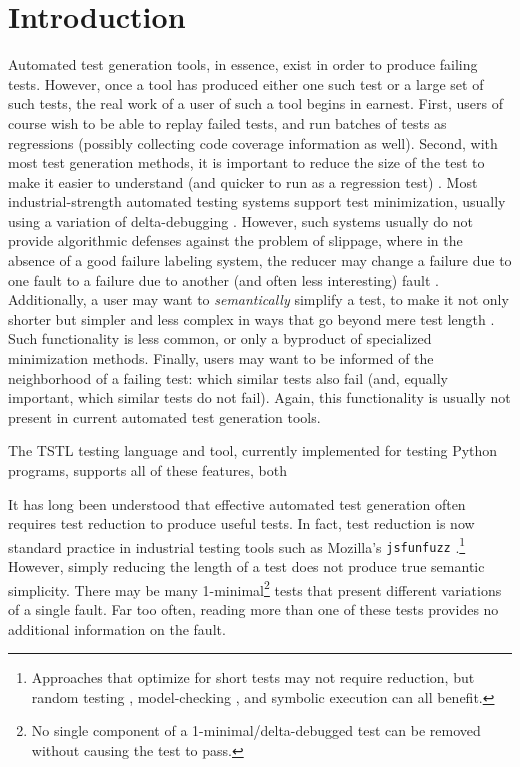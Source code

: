 \section{Introduction}

Automated test generation tools, in essence, exist in order to produce
failing tests.  However, once a tool has produced either one such test
or a large set of such tests, the real work of a user of such a tool
begins in earnest.  First, users of course wish to be able to replay
failed tests, and run batches of tests as regressions (possibly
collecting code coverage information as well).  Second, with most test generation methods, it is
important to reduce the size of the test to make it easier to
understand (and quicker to run as a regression test)
\cite{DD,MinUnit,TCminim,ICSEDiff}.  Most industrial-strength
automated testing systems support test minimization, usually using a
variation of delta-debugging \cite{CReduce,hypothesis,lithum}.
However, such systems usually do not provide algorithmic defenses
against the problem of slippage, where in the absence of a good
failure labeling system, the reducer may change a failure due to one
fault to a failure due to another (and often less interesting) fault \cite{PLDI13,slippage}.
Additionally, a user may want to \emph{semantically} simplify a test, to
make it not only shorter but simpler and less complex in ways that go
beyond mere test length \cite{OneTest}.  Such functionality is less common, or only a
byproduct of specialized minimization methods.  Finally, users may
want to be informed of the neighborhood of a failing test:  which
similar tests also fail (and, equally important, which similar tests
do not fail).  Again, this functionality is usually not present in
current automated test generation tools.

The TSTL testing language and tool, currently implemented for testing
Python programs, supports all of these features, both 

It has long been understood that effective automated test generation often requires
test reduction \cite{DD,MinUnit,TCminim,ICSEDiff} to produce useful tests.  In fact, test reduction is
now standard practice in industrial testing tools such as Mozilla's
{\tt jsfunfuzz} \cite{jsfunfuzz,jsfunfuzz2,lithium}.\footnote{Approaches that
  optimize for short tests \cite{SoftBET,FA11} may not require reduction, but random
  testing \cite{RandFormal,HamletOnly}, model-checking
  \cite{Gastin04minimizationof}, and symbolic execution \cite{issta14}
  can all benefit.}  However, simply reducing the length of a test
does not produce true semantic simplicity.  There may be many
1-minimal\footnote{No
  single component of a 1-minimal/delta-debugged \cite{DD} test can be removed without
  causing the test to pass.} tests
that present different variations of a single fault.  Far too often,
reading more than one of these tests provides no
additional information on the fault.

